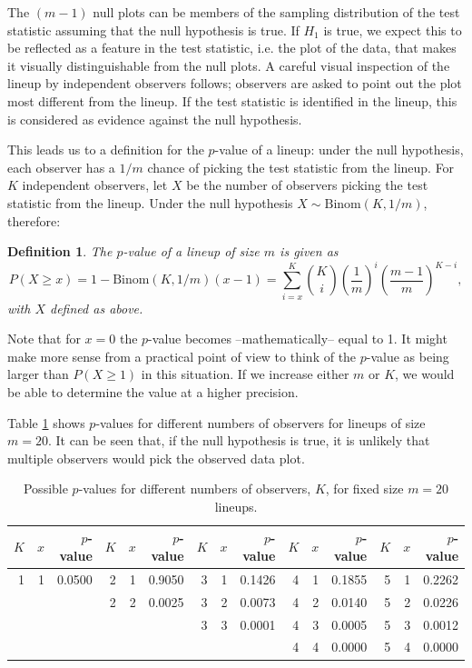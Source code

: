\documentclass{article}
\newtheorem{dfn}{Definition}[section]
\begin{document}
\noindent The $(m-1)$ null plots can be members of the sampling distribution of the test statistic assuming that the null hypothesis is true. If $H_1$ is true, we expect this to be reflected as a feature in the test statistic, i.e. the plot of the data, that makes it visually distinguishable from the null plots. A careful visual inspection of the lineup by %
independent observers follows;  observers are asked to point out the plot most different from the lineup. If the test statistic is identified in the lineup, this is considered as evidence against the null hypothesis. 

This leads us to a definition for the $p$-value of a lineup: under the null hypothesis, each observer has a $1/m$ chance of picking the test statistic from the lineup.  For $K$ independent observers, let $X$ be  the number of observers picking the test statistic from the lineup. Under the null hypothesis $X \sim \text{Binom}({K, 1/m})$,  therefore: 

\begin{dfn}\label{dfn:pvalue}
The $p$-value of a lineup of size $m$ is given as 
\[
P(X \ge x) = 1 - \text{Binom}({K, 1/m}) (x-1) = \sum_{i=x}^{K} {K \choose i} \left(\frac{1}{m}\right)^{i} \left(\frac{m-1}{m}\right)^{K-i},
\]
with $X$ defined as above. 
\end{dfn}
Note that for $x=0$ the $p$-value becomes --mathematically-- equal to 1. It might make more sense from a practical point of view to think of the $p$-value as
being larger than $P(X \ge 1)$ in this situation. If we increase either $m$ or $K$, we would be able to determine the value at a higher precision.

\noindent Table \ref{pvalue} shows $p$-values for different numbers of observers for lineups of size $m = 20$. It can be seen that, if the null hypothesis is true, it is unlikely that multiple observers would pick the observed data plot.

\begin{table}[htp]
\begin{center}
\begin{tabular}{|rrr|rrr|rrr|rrr|rrr|}\hline
$K$ &  $x$ & $p$-value & $K$ &  $x$ & $p$-value & $K$ &  $x$ & $p$-value & $K$  & $x$ & $p$-value & $K$  & $x$ & $p$-value\\\hline
1 &  1 & 0.0500 & 2 &  1 & 0.9050 & 3 & 1 & 0.1426 & 4 & 1 & 0.1855 & 5 & 1 & 0.2262 \\%
&&& 2 &  2 & 0.0025 & 3 & 2 & 0.0073 & 4 & 2 & 0.0140 & 5 & 2 & 0.0226 \\
&&& &&& 3 & 3 & 0.0001 & 4 & 3 & 0.0005 & 5 & 3 & 0.0012 \\%
&&&  &    &        &   &   &        & 4 & 4 & 0.0000 & 5 & 4 & 0.0000 \\\hline
\end{tabular}
\end{center}
\caption{Possible $p$-values for different numbers of observers, $K$, for fixed size $m = 20$ lineups.}
\label{pvalue}
\end{table}
\end{document}
